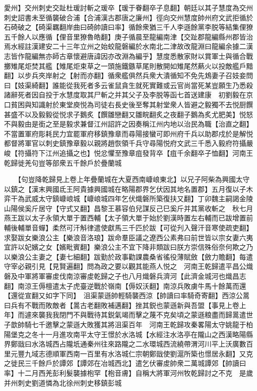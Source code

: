 愛州】交州刺史交趾杜瑗討斬之瑗卒【瑗于眷翻卒子息翻】朝廷以其子慧度為交州刺史詔書未至循襲破合浦【合浦漢古郡唐之廉州】徑向交州慧度帥州府文武拒循於石碕破之【碕渠羈翻岸曲曰碕帥讀曰率】循餘衆猶三千人李遜餘黨李脱等結集俚獠五千餘人以應循【俚音里獠魯皓翻】庚子循晨至龍編南津【交趾郡龍編縣州郡皆治焉水經註漢建安二十三年立州之始蛟龍磐編於水南北二津故改龍淵曰龍編余據二漢志皆作龍編無亦師古章懷避唐諱因亦改淵為編乎】慧度悉散家財以賞軍士與循合戰擲雉尾炬焚其艦【雉尾炬束草之一頭施鐵鏃草尾則散開如雉尾然爇火以投敵艦戶黯翻】以步兵夾岸射之【射而亦翻】循衆艦俱然兵衆大潰循知不免先鴆妻子召妓妾問曰【妓渠綺翻】誰能從我死者多云雀鼠貪生就死實難或云官尚當死某豈願生乃悉殺諸辭死者因自投于水慧度取其尸斬之并其父子及李脱等函七首送建康　初劉毅在京口貧困與知識射於東堂庾悦為司徒右長史後至奪其射堂衆人皆避之毅獨不去悦厨饌甚盛不以及毅毅從悦求子鵝炙【饌雛戀翻又雛睆翻炙之夜翻子鵝為炙尤肥美】悦怒不與毅由是銜之至是毅求兼督江州詔許之因奏稱江州内地以治民為職【治直之翻】不當置軍府彫耗民力宜罷軍府移鎮豫章而尋陽接蠻可即州府千兵以助郡戍於是解悦都督將軍官以刺史鎮豫章毅以親將趙恢領千兵守尋陽悦府文武三千悉入毅府符攝嚴峻【符攝符下江州追攝之也】悦忿懼至豫章疽發背卒【疽千余翻卒子恤翻】河南王乾歸徙羌句豈等部衆五千餘戶於疊蘭城

　　【句豈降乾歸見上卷上年疊蘭城在大夏西南嵻㟍東北】以兄子阿柴為興國太守以鎮之【漢末興國氐王阿貴據興國城在略陽郡界乞伏因其地名置郡】五月復以子木弈干為武威太守鎮嵻㟍城【嵻㟍城四年乞伏熾磐所築復扶又翻】丁卯魏主嗣謁金陵山陽侯奚斤居守【守式又翻】昌黎王慕容伯兒謀反己巳奚斤并其黨收斬之　秋七月燕王跋以太子永領大單于置西輔【太子領大單于始於劉漢時置左右輔而已跋增置前輔後輔單音蟬】柔然可汗斛律遣使獻馬三千匹於跋【可從刋入聲汗音寒使疏吏翻】求娶跋女樂浪公主【樂浪音洛琅】跋命羣臣議之遼西公素弗曰前世皆以宗女妻六夷宜許以妃嬪之女【嬪毗賓翻】樂浪公主不宜下降非類跋曰朕方崇信殊俗奈何欺之乃以樂浪公主妻之【妻七細翻】跋勤於政事勸課農桑省徭役薄賦斂【斂力贍翻】每遣守宰必親引見【見賢遍翻】問為政之要以觀其能燕人悦之　河南王乾歸遣平昌公熾磐及中軍將軍審䖍伐南涼審䖍乾歸之子也八月熾磐兵濟河【此濟金城河也熾昌志翻】南涼王傉檀遣太子虎臺逆戰於嶺南【傉奴沃翻】南涼兵敗虜牛馬十餘萬而還【還從宣翻又如字下同】　沮渠蒙遜帥輕騎襲西涼【帥讀曰率騎奇寄翻】西涼公暠曰兵有不戰而敗敵者【暠古老翻敗補邁翻】挫其鋭也蒙遜新與吾盟【事見上卷上年】而遽來襲我我閉門不與戰待其鋭氣竭而擊之蔑不克矣頃之蒙遜粮盡而歸暠遣世子歆帥騎七千邀擊之蒙遜大敗獲其將沮渠百年　河南王乾歸攻秦畧陽太守姚龍于柏陽堡克之冬十一月進攻南平太守王憬於水洛城【水經注水洛亭在隴山之西漢略陽縣界鄭戩曰水洛城西占隴坁通秦州往來路隴之二水環城西流繞帶渭河川平上沃廣數百里元豐九域志德順軍西南一百里有水洛城仁宗朝鄭戩使劉滬所築也憬居永翻】又克之徙民三千餘戶於譚郊【譚郊在冶城西北】遣乞伏審䖍帥衆二萬城譚郊【帥讀曰率】十二月西羌彭利髮襲據枹罕【枹音膚】自稱大將軍河州牧乾歸討之不克　是歲并州刺史劉道憐為北徐州刺史移鎮彭城

